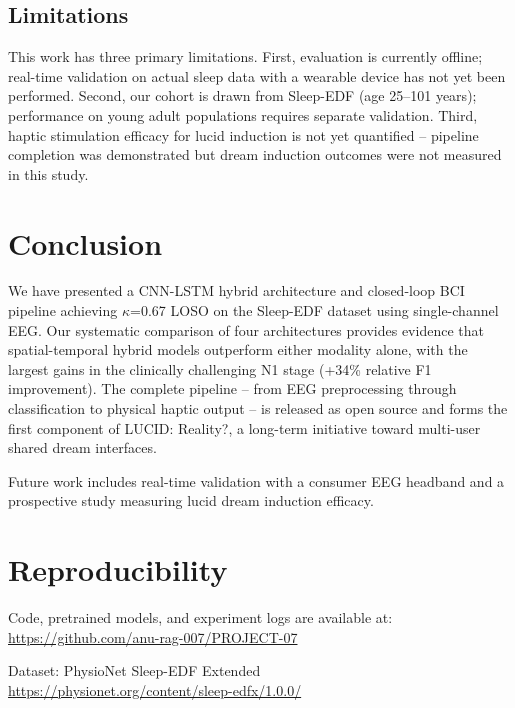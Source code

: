 \documentclass[journal]{IEEEtran}
\begin{document}
\subsection{Limitations}

This work has three primary limitations.
First, evaluation is currently offline; real-time
validation on actual sleep data with a wearable
device has not yet been performed.
Second, our cohort is drawn from Sleep-EDF
(age 25--101 years); performance on young adult
populations requires separate validation.
Third, haptic stimulation efficacy for lucid
induction is not yet quantified -- pipeline
completion was demonstrated but dream induction
outcomes were not measured in this study.

\section{Conclusion}
\label{sec:conclusion}

We have presented a CNN-LSTM hybrid architecture
and closed-loop BCI pipeline achieving $\kappa$=0.67
LOSO on the Sleep-EDF dataset using single-channel
EEG.
Our systematic comparison of four architectures
provides evidence that spatial-temporal hybrid
models outperform either modality alone, with the
largest gains in the clinically challenging N1
stage (+34\% relative F1 improvement).
The complete pipeline -- from EEG preprocessing
through classification to physical haptic output
-- is released as open source and forms the first
component of LUCID: Reality?, a long-term initiative
toward multi-user shared dream interfaces.

Future work includes real-time validation with a 
consumer EEG headband and a prospective study 
measuring lucid dream induction efficacy.

\appendix
\section{Reproducibility}

Code, pretrained models, and experiment logs are
available at:
\url{https://github.com/anu-rag-007/PROJECT-07}

Dataset: PhysioNet Sleep-EDF Extended\\
\url{https://physionet.org/content/sleep-edfx/1.0.0/}



\end{document}
